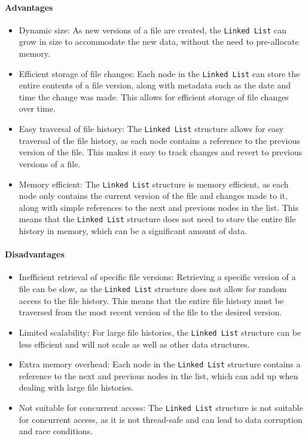 \paragraph{Advantages}
\begin{itemize}
    \item Dynamic size: As new versions of a file are created, the \lstinline{Linked List} can grow in size to accommodate the new data, without the need to pre-allocate memory.
    \item Efficient storage of file changes: Each node in the \lstinline{Linked List} can store the entire contents of a file version, along with metadata such as the date and time the change was made. This allows for efficient storage of file changes over time.
    \item Easy traversal of file history: The \lstinline{Linked List} structure allows for easy traversal of the file history, as each node contains a reference to the previous version of the file. This makes it easy to track changes and revert to previous versions of a file.
    \item Memory efficient: The \lstinline{Linked List} structure is memory efficient, as each node only contains the current version of the file and changes made to it, along with simple references to the next and previous nodes in the list. This means that the \lstinline{Linked List} structure does not need to store the entire file history in memory, which can be a significant amount of data.
\end{itemize}
\paragraph{Disadvantages}
\begin{itemize}
    \item Inefficient retrieval of specific file versions: Retrieving a specific version of a file can be slow, as the \lstinline{Linked List} structure does not allow for random access to the file history. This means that the entire file history must be traversed from the most recent version of the file to the desired version.
    \item Limited scalability: For large file histories, the \lstinline{Linked List} structure can be less efficient and will not scale as well as other data structures.
    \item Extra memory overhead: Each node in the \lstinline{Linked List} structure contains a reference to the next and previous nodes in the list, which can add up when dealing with large file histories.
    \item Not suitable for concurrent access: The \lstinline{Linked List} structure is not suitable for concurrent access, as it is not thread-safe and can lead to data corruption and race conditions.
\end{itemize}

